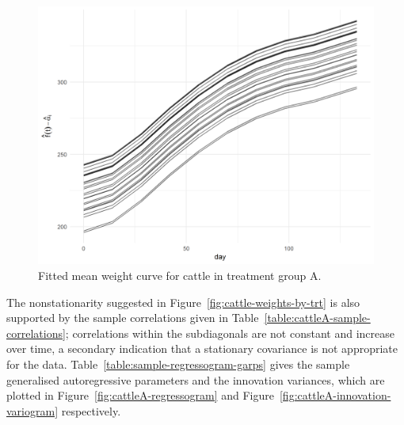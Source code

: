 \documentclass[12pt]{article}
\theoremstyle{definition}
\begin{document}
\begin{figure}[h] \label{fig:cattleA-smoothed-weights-vs-time}
\caption{Fitted mean weight curve for cattle in treatment group A. }
\begin{center}
\includegraphics[width = \textwidth]{img/cattle/cattleA-weights-vs-time-mean-fit}
\end{center}
\end{figure} 

The nonstationarity suggested in Figure~\ref{fig:cattle-weights-by-trt} is also supported by the sample correlations given in Table~\ref{table:cattleA-sample-correlations}; correlations within the subdiagonals are not constant and increase over time, a secondary indication that a stationary covariance is not appropriate for the data.  Table~\ref{table:sample-regressogram-garps} gives the sample generalised autoregressive parameters and the innovation variances, which are plotted in Figure~\ref{fig:cattleA-regressogram} and Figure~\ref{fig:cattleA-innovation-variogram} respectively. 
\end{document}
